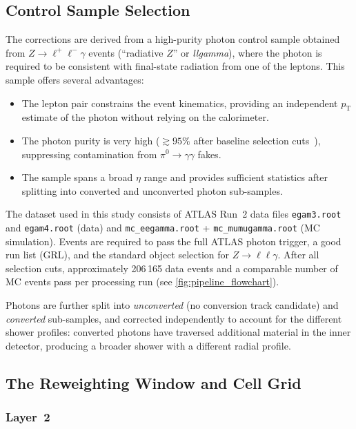 \documentclass[11pt,a4paper]{article}
\begin{document}
\subsection{Control Sample Selection}
\label{sec:method:selection}

The corrections are derived from a high-purity photon control sample
obtained from $Z \to \ell^+\ell^-\gamma$ events (``radiative $Z$''
or \emph{llgamma}), where the photon is required to be consistent
with final-state radiation from one of the leptons.  This sample
offers several advantages:
\begin{itemize}
  \item The lepton pair constrains the event kinematics, providing an
        independent $p_\mathrm{T}$ estimate of the photon without
        relying on the calorimeter.
  \item The photon purity is very high ($\gtrsim 95\%$ after baseline
        selection cuts~\cite{ATLAS:photonID2022}), suppressing
        contamination from $\pi^0 \to \gamma\gamma$ fakes.
  \item The sample spans a broad $\eta$ range and provides sufficient
        statistics after splitting into converted and unconverted
        photon sub-samples.
\end{itemize}

The dataset used in this study consists of ATLAS Run~2 data
files \texttt{egam3.root} and \texttt{egam4.root} (data) and
\texttt{mc\_eegamma.root} + \texttt{mc\_mumugamma.root} (MC simulation).
Events are required to pass the full ATLAS photon trigger, a good
run list (GRL), and the standard object selection for $Z \to \ell\ell\gamma$.
After all selection cuts, approximately 206\,165 data events and a
comparable number of MC events pass per processing run (see
\cref{fig:pipeline_flowchart}).

Photons are further split into \emph{unconverted} (no conversion track
candidate) and \emph{converted} sub-samples, and corrected
independently to account for the different shower profiles: converted
photons have traversed additional material in the inner detector,
producing a broader shower with a different radial profile.

\subsection{The Reweighting Window and Cell Grid}
\label{sec:method:grid}

\subsubsection{Layer~2}
\label{sec:method:grid:l2}
\end{document}
